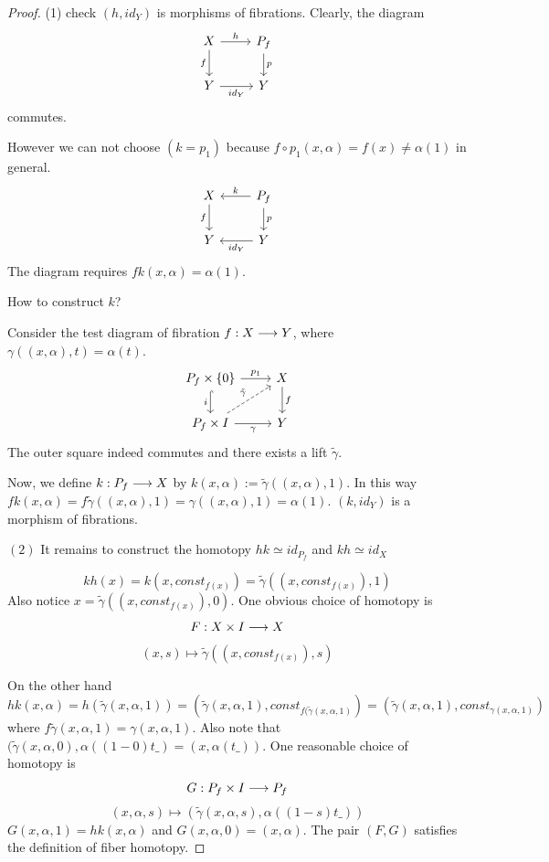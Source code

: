 \documentclass[11pt]{book} %
\begin{document}
\begin{proof}
 (1) check $(h,id_Y)$ is morphisms of fibrations. Clearly, the diagram 
 $$
\begin{tikzcd}
X \arrow[d, "f"'] \arrow[r, "h"] & P_f \arrow[d, "p"] \\
Y \arrow[r, "id_Y"'] & Y
\end{tikzcd}
 $$
 commutes.

 However we can not choose $(k=p_1)$ because $f\circ p_1(x,\alpha)=f(x)\neq \alpha(1)$ in general.
 $$
\begin{tikzcd}
X \arrow[d, "f"'] & P_f \arrow[l, "k"'] \arrow[d, "p"] \\
Y & Y \arrow[l, "id_Y"]
\end{tikzcd}
 $$
 The diagram requires $fk(x,\alpha)=\alpha(1)$.

 How to construct $k$?

Consider the test diagram of fibration $f:X\longrightarrow Y$, where $\gamma((x,\alpha),t)=\alpha(t)$.
 $$
\begin{tikzcd}
P_f\times\{0\} \arrow[d, "i"', hook] \arrow[r, "p_1"] & X \arrow[d, "f"] \\
P_f\times I \arrow[r, "\gamma"'] \arrow[ru, "\tilde{\gamma}", dashed] & Y
\end{tikzcd}
 $$
 The outer square indeed commutes and there exists a lift $\tilde{\gamma}$. 

 Now, we define $k:P_f\longrightarrow X$ by $k(x,\alpha):=\tilde{\gamma}((x,\alpha),1)$. In this way $fk(x,\alpha)=f\tilde{\gamma}((x,\alpha),1)=\gamma((x,\alpha),1)=\alpha(1)$. $(k,id_Y)$ is a morphism of fibrations.

 $(2)$ It remains to construct the homotopy $hk\simeq id_{P_f}$ and $kh\simeq id_{X}$

 $$
kh(x)=k(x,const_{f(x)})=\tilde{\gamma}((x,const_{f(x)}),1)
 $$
Also notice $x=\tilde{\gamma}((x, const_{f(x)}),0)$. One obvious choice of homotopy is 
$$
F: X\times I\longrightarrow X
$$
$$
(x,s)\longmapsto \tilde{\gamma}((x,const_{f(x)}),s)
$$

On the other hand
$$
hk(x,\alpha)=h(\tilde{\gamma}(x,\alpha,1))=(\tilde{\gamma}(x,\alpha,1), const_{f(\tilde{\gamma}(x,\alpha,1)})=(\tilde{\gamma}(x,\alpha,1), const_{\gamma(x,\alpha,1)})
$$
where $f\tilde{\gamma}(x,\alpha,1)=\gamma(x,\alpha,1)$. Also note that $(\tilde{\gamma}(x,\alpha,0), \alpha((1-0)t\_)=(x,\alpha(t\_))$. One reasonable choice of homotopy is
$$
G: P_f\times I\longrightarrow P_f
$$
$$
(x,\alpha,s)\mapsto (\tilde{\gamma}(x,\alpha,s),\alpha((1-s)t\_) )
$$
$G(x,\alpha,1)=hk(x,\alpha)$ and $G(x,\alpha,0)=(x,\alpha)$. The pair $(F,G)$ satisfies the definition of fiber homotopy.
\end{proof}
\end{document}
